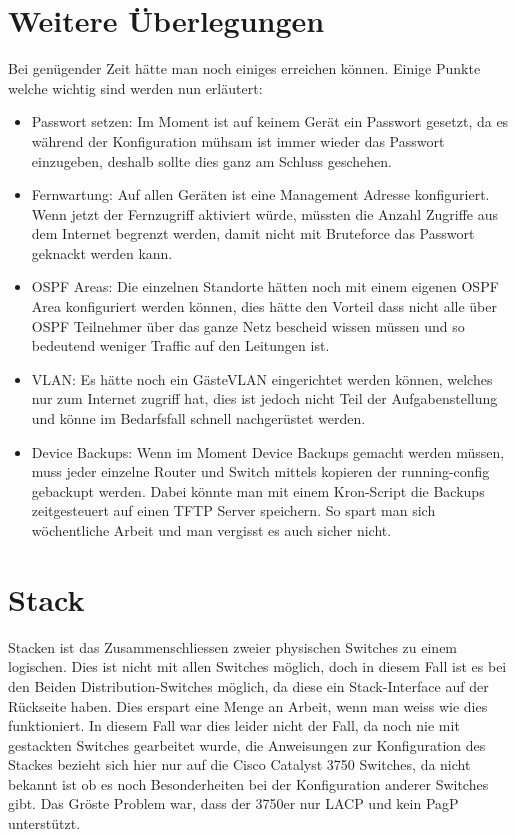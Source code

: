 \documentclass[11pt,a4paper]{scrreprt}
\begin{document}
\section{Weitere Überlegungen}

Bei genügender Zeit hätte man noch einiges erreichen können. Einige Punkte welche wichtig sind werden nun erläutert:
\begin{itemize}
\item Passwort setzen: Im Moment ist auf keinem Gerät ein Passwort gesetzt, da es während der Konfiguration mühsam ist immer wieder das Passwort einzugeben, deshalb sollte dies ganz am Schluss geschehen.
\item Fernwartung: Auf allen Geräten ist eine Management Adresse konfiguriert. Wenn jetzt der Fernzugriff aktiviert würde, müssten die Anzahl Zugriffe aus dem Internet begrenzt werden, damit nicht mit Bruteforce das Passwort geknackt werden kann.
\item OSPF Areas: Die einzelnen Standorte hätten noch mit einem eigenen OSPF Area konfiguriert werden können, dies hätte den Vorteil dass nicht alle über OSPF Teilnehmer über das ganze Netz bescheid wissen müssen und so bedeutend weniger Traffic auf den Leitungen ist.
\item \acs{VLAN}: Es hätte noch ein Gäste\acs{VLAN} eingerichtet werden können, welches nur zum Internet zugriff hat, dies ist jedoch nicht Teil der Aufgabenstellung und könne im Bedarfsfall schnell nachgerüstet werden.
\item Device Backups: Wenn im Moment Device Backups gemacht werden müssen, muss jeder einzelne Router und Switch mittels kopieren der running-config gebackupt werden. Dabei könnte man mit einem Kron-Script die Backups zeitgesteuert auf einen TFTP Server speichern. So spart man sich wöchentliche Arbeit und man vergisst es auch sicher nicht.
\end{itemize}

\section{Stack}
Stacken ist das Zusammenschliessen zweier physischen Switches zu einem logischen. Dies ist nicht mit allen Switches möglich, doch in diesem Fall ist es bei den Beiden Distribution-Switches möglich, da diese ein Stack-Interface auf der Rückseite haben. Dies erspart eine Menge an Arbeit, wenn man weiss wie dies funktioniert. In diesem Fall war dies leider nicht der Fall, da noch nie mit gestackten Switches gearbeitet wurde, die Anweisungen zur Konfiguration des Stackes bezieht sich hier nur auf die Cisco Catalyst 3750 Switches, da nicht bekannt ist ob es noch Besonderheiten bei der Konfiguration anderer Switches gibt. Das Gröste Problem war, dass der 3750er nur \acs{LACP} und kein \acs{PagP} unterstützt.
\end{document}
